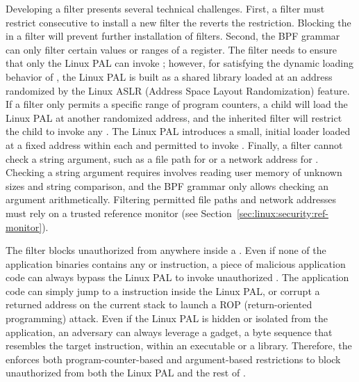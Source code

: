 Developing a \seccomp{} filter presents several technical challenges.
First, a filter must restrict consecutive \picoprocs{}
to install a new filter the reverts the \linuxapi{} restriction.
Blocking the  \linuxapi{} in a \seccomp{} filter will prevent further installation of \seccomp{} filters.
Second, the BPF grammar can only filter certain values or ranges of a register.
The filter needs to
ensure that only the Linux PAL can invoke \linuxapis{};
however,
for satisfying the dynamic loading behavior of \thehostabi{},
the Linux PAL
is built as a shared library loaded at an address randomized by the Linux ASLR (Address Space Layout Randomization) feature.
If a filter only permits a specific range of program counters,
a child \picoproc{}
will load the Linux PAL at another randomized address,
and the inherited filter will restrict the child \picoproc{} to invoke any \linuxapis{}.
The Linux PAL introduces a small, initial loader
loaded at a fixed address
within each \picoproc{} and permitted to invoke \linuxapis{}.
Finally, a \seccomp{} filter
cannot check a string argument, such as a file path for  or a network address for .
Checking a string argument requires
involves reading user memory of unknown sizes and string comparison, and the BPF grammar only allows checking an argument arithmetically.
Filtering permitted file paths and network addresses
must rely on a trusted reference monitor (see Section~\ref{sec:linux:security:ref-monitor}).



The \seccomp{} filter blocks  unauthorized \linuxapis{}
from anywhere inside a \picoproc{}.
Even if none of the application binaries contains any  or  instruction,
a piece of malicious application code can always bypass the Linux PAL
to invoke unauthorized \linuxapis{}.
The application code can simply
jump to a  instruction inside the Linux PAL,
or corrupt a returned address on the current stack to launch a ROP (return-oriented programming) attack.
Even if the Linux PAL is hidden or isolated from the application,
an adversary can always leverage a gadget, a byte sequence that resembles the target instruction, within an executable or a library.
Therefore, the \seccomp{} enforces both program-counter-based 
and argument-based restrictions
to block unauthorized \linuxapis{} from both the Linux PAL and the rest of \picoproc{}.


